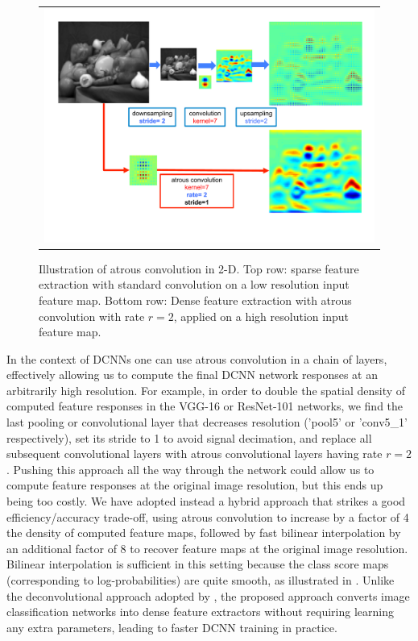 \begin{figure}
  \centering
    \begin{tabular}{c}
    	\includegraphics[width=.99 \linewidth]{fig/atrous_slide_rate.pdf}
    	\vspace{-.9cm}
    \end{tabular}
   \caption{Illustration of atrous convolution in 2-D. Top row: sparse feature
   	extraction with standard convolution on a low resolution input feature map.
   	Bottom row: Dense feature extraction with atrous convolution with rate $r = 2$,
   	applied on a high resolution input feature map.}
    \label{fig:hole2d}
   \end{figure}

In the context of DCNNs one can use  atrous convolution in a chain of layers,
 effectively allowing us to compute the final DCNN network responses at an
arbitrarily high resolution. For example, in order to double the spatial density
of computed feature responses in the VGG-16 or ResNet-101 networks, we find the
last pooling or convolutional layer that decreases resolution ('pool5' or 'conv5\_1'
respectively), set its stride to 1 to avoid signal decimation, and replace all
subsequent convolutional layers with atrous convolutional layers having rate
$r = 2$. 
Pushing this approach all the
way through the network could allow us to compute feature responses at the original image
resolution, but this ends up being too
costly. We have adopted instead a hybrid approach that strikes a
good efficiency/accuracy trade-off, using atrous convolution to increase by a
factor of 4 the density of computed feature maps, followed by fast bilinear
interpolation by an additional factor of 8 to
recover feature maps at the original image resolution. Bilinear interpolation
is sufficient in this setting because the class score maps (corresponding to
log-probabilities) are quite smooth, as illustrated in
. Unlike the deconvolutional approach adopted by
\cite{long2014fully}, the proposed approach converts image classification
networks into dense feature extractors without requiring learning any extra
parameters, leading to faster DCNN training in practice. 

